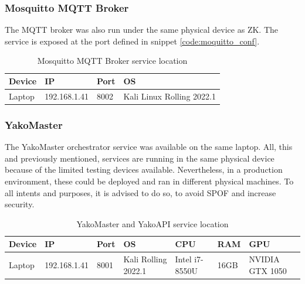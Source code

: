         \subsubsection{Mosquitto MQTT Broker}
            The MQTT broker was also run under the same physical device as ZK. The service is exposed at the port defined in snippet \ref{code:moquitto_conf}.
            
            \begin{table}[H]
                \centering
                \caption{Mosquitto MQTT Broker service location}
                \label{tab:test_mqtt}
                \begin{tabular}{|l|l|l|l|}
                    \hline
                    \rowcolor[HTML]{C0C0C0}
                    \textbf{Device} & \textbf{IP}  & \textbf{Port} & \textbf{OS} \\\hline
                    Laptop & 192.168.1.41 & 8002 & Kali Linux Rolling 2022.1 \\ \hline
                \end{tabular}
            \end{table}
        
        \subsubsection{YakoMaster}
            The YakoMaster orchestrator service was available on the same laptop. All, this and previously mentioned, services are running in the same physical device because of the limited testing devices available. Nevertheless, in a production environment, these could be deployed and ran in different physical machines. To all intents and purposes, it is advised to do so, to avoid SPOF \cite{vmware_inc_what_nodate} and increase security.
            
            \begin{table}[H]
                \centering
                \caption{YakoMaster and YakoAPI service location}
                \label{tab:test_yakomasters}
                \begin{tabularx}{\linewidth}{|l|l|l|X|l|l|X|}
                    \hline
                    \rowcolor[HTML]{C0C0C0}
                    \textbf{Device} & \textbf{IP} & \textbf{Port} & \textbf{OS} & \textbf{CPU} & \textbf{RAM} & \textbf{GPU} \\ \hline
                    Laptop & 192.168.1.41 & 8001 & Kali Rolling 2022.1 & Intel i7-8550U & 16GB & NVIDIA GTX 1050 \\ \hline
                \end{tabularx}
            \end{table}
        
